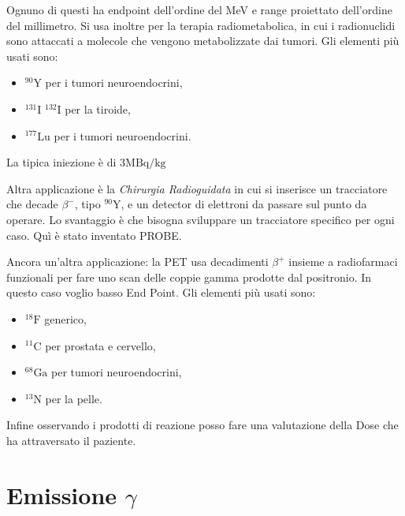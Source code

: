 \documentclass [a4paper, twoside] {book}
\begin{document}
Ognuno di questi ha endpoint dell'ordine del MeV e range proiettato dell'ordine del millimetro.
Si usa inoltre per la terapia radiometabolica, in cui i radionuclidi sono attaccati a molecole che vengono metabolizzate dai tumori. Gli elementi più usati sono:

\begin{itemize}
\item $^{90}\text{Y}$ per i tumori neuroendocrini,
\item $^{131}\text{I}$ $^{132}\text{I}$ per la tiroide,
\item $^{177}\text{Lu}$ per i tumori neuroendocrini.
\end{itemize}

La tipica iniezione è di $3 \text{MBq/kg}$

Altra applicazione è la \emph{Chirurgia Radioguidata} in cui si inserisce un tracciatore che decade $\beta^-$, tipo $^{90}\text{Y}$, e un detector di elettroni da passare sul punto da operare. Lo svantaggio è che bisogna sviluppare un tracciatore specifico per ogni caso. Quì è stato inventato PROBE.

Ancora un'altra applicazione: la PET usa decadimenti $\beta^+$ insieme a radiofarmaci funzionali per fare uno scan delle coppie gamma prodotte dal positronio. In questo caso voglio basso End Point. Gli elementi più usati sono:

\begin{itemize}
\item $^{18}\text{F}$ generico,
\item $^{11}\text{C}$ per prostata e cervello,
\item $^{68}\text{Ga}$ per tumori neuroendocrini,
\item $^{13}\text{N}$ per la pelle.
\end{itemize}

Infine osservando i prodotti di reazione posso fare una valutazione della Dose che ha attraversato il paziente.

\section{Emissione $\gamma$}
\end{document}
